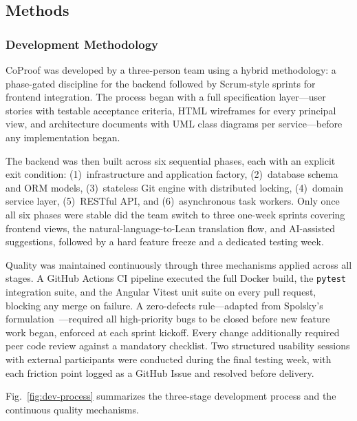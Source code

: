 \documentclass[conference]{IEEEtran}
\begin{document}
\subsection{Methods}
\label{subsec:methods}

\subsubsection{Development Methodology}
\label{subsubsec:dev-methodology}

CoProof was developed by a three-person team using a hybrid methodology:
a phase-gated discipline for the backend followed by Scrum-style sprints
for frontend integration. The process began with a full specification
layer---user stories with testable acceptance criteria, HTML wireframes
for every principal view, and architecture documents with UML class
diagrams per service---before any implementation began.

The backend was then built across six sequential phases, each with an
explicit exit condition: (1)~infrastructure and application factory,
(2)~database schema and ORM models, (3)~stateless Git engine with
distributed locking, (4)~domain service layer, (5)~RESTful API, and
(6)~asynchronous task workers. Only once all six phases were stable did
the team switch to three one-week sprints covering frontend views, the
natural-language-to-Lean translation flow, and AI-assisted suggestions,
followed by a hard feature freeze and a dedicated testing week.

Quality was maintained continuously through three mechanisms applied
across all stages. A GitHub Actions CI pipeline executed the full Docker
build, the \texttt{pytest} integration suite, and the Angular Vitest unit
suite on every pull request, blocking any merge on failure. A
zero-defects rule---adapted from Spolsky's
formulation~\cite{ref:spolsky}---required all high-priority bugs to be
closed before new feature work began, enforced at each sprint kickoff.
Every change additionally required peer code review against a mandatory
checklist. Two structured usability sessions with external participants
were conducted during the final testing week, with each friction point
logged as a GitHub Issue and resolved before delivery.

Fig.~\ref{fig:dev-process} summarizes the three-stage development process
and the continuous quality mechanisms.
\end{document}
